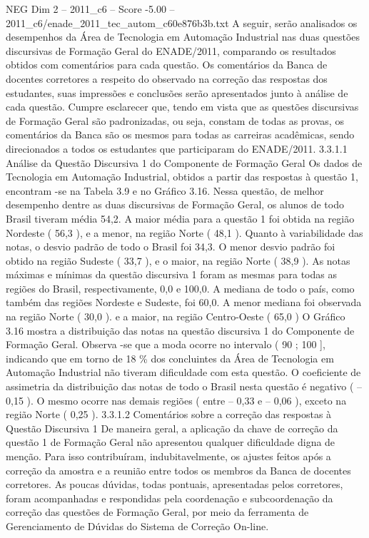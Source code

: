 \begin{textsample}{NEG Dim 2 – 2011\_c6 – Score -5.00 – 2011\_c6/enade\_2011\_tec\_autom\_c60e876b3b.txt}
A seguir, serão analisados os desempenhos da Área de Tecnologia em Automação Industrial nas duas questões discursivas de Formação Geral do ENADE/2011, comparando os resultados obtidos com comentários para cada questão.
Os comentários da Banca de docentes corretores a respeito do observado na correção das respostas dos estudantes, suas impressões e conclusões serão apresentados junto à análise de cada questão.
Cumpre esclarecer que, tendo em vista que as questões discursivas de Formação Geral são padronizadas, ou seja, constam de todas as provas, os comentários da Banca são os mesmos para todas as carreiras acadêmicas, sendo direcionados a todos os estudantes que participaram do ENADE/2011. 3.3.1.1 Análise da Questão Discursiva 1 do Componente de Formação Geral Os dados de Tecnologia em Automação Industrial, obtidos a partir das respostas à questão 1, encontram -se na Tabela 3.9 e no Gráfico 3.16.
Nessa questão, de melhor desempenho dentre as duas discursivas de Formação Geral, os alunos de todo Brasil tiveram média 54,2.
A maior média para a questão 1 foi obtida na região Nordeste ( 56,3 ), e a menor, na região Norte ( 48,1 ).
Quanto à variabilidade das notas, o desvio padrão de todo o Brasil foi 34,3.
O menor desvio padrão foi obtido na região Sudeste ( 33,7 ), e o maior, na região Norte ( 38,9 ).
As notas máximas e mínimas da questão discursiva 1 foram as mesmas para todas as regiões do Brasil, respectivamente, 0,0 e 100,0.
A mediana de todo o país, como também das regiões Nordeste e Sudeste, foi 60,0.
A menor mediana foi observada na região Norte ( 30,0 ). e a maior, na região Centro-Oeste ( 65,0 ) O Gráfico 3.16 mostra a distribuição das notas na questão discursiva 1 do Componente de Formação Geral.
Observa -se que a moda ocorre no intervalo ( 90 ; 100 ], indicando que em torno de 18 \% dos concluintes da Área de Tecnologia em Automação Industrial não tiveram dificuldade com esta questão.
O coeficiente de assimetria da distribuição das notas de todo o Brasil nesta questão é negativo ( – 0,15 ).
O mesmo ocorre nas demais regiões ( entre – 0,33 e – 0,06 ), exceto na região Norte ( 0,25 ). 3.3.1.2 Comentários sobre a correção das respostas à Questão Discursiva 1 De maneira geral, a aplicação da chave de correção da questão 1 de Formação Geral não apresentou qualquer dificuldade digna de menção.
Para isso contribuíram, indubitavelmente, os ajustes feitos após a correção da amostra e a reunião entre todos os membros da Banca de docentes corretores.
As poucas dúvidas, todas pontuais, apresentadas pelos corretores, foram acompanhadas e respondidas pela coordenação e subcoordenação da correção das questões de Formação Geral, por meio da ferramenta de Gerenciamento de Dúvidas do Sistema de Correção On-line.

\end{textsample}
